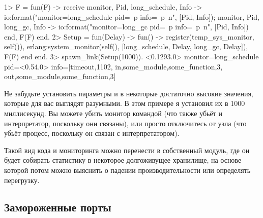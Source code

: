 \begin{VerbatimEshell}
1> F = fun(F) ->
    receive
        {monitor, Pid, long_schedule, Info} ->
            io:format("monitor=long_schedule pid=~p info=~p~n", [Pid, Info]);
        {monitor, Pid, long_gc, Info} -> 
            io:format("monitor=long_gc pid=~p info=~p~n", [Pid, Info])
    end,
    F(F)
end.
2> Setup = fun(Delay) -> fun() -> 
     register(temp_sys_monitor, self()),
     erlang:system_monitor(self(), [{long_schedule, Delay}, {long_gc, Delay}]),
     F(F)
end end.
3> spawn_link(Setup(1000)).
<0.1293.0>
monitor=long_schedule pid=<0.54.0> info=[{timeout,1102},
                                         {in,{some_module,some_function,3}},
                                         {out,{some_module,some_function,3}}]
\end{VerbatimEshell}

Не забудьте установить параметры  и  в некоторые достаточно высокие значения, которые для вас выглядят разумными. В этом примере я установил их в 1000 миллисекунд. Вы можете убить монитор командой  (что также убьёт и интерпретатор, поскольку они связаны), или просто отключитесь от узла (что убьёт процесс, поскольку он связан с интерпретатором).

Такой вид кода и мониторинга можно перенести в собственный модуль, где он будет собирать статистику в некоторое долгоживущее хранилище, на основе которой потом можно выяснить о падении производительности или определять перегрузку.


\subsection{Замороженные порты}
\label{subsec:port-system-monitors}

